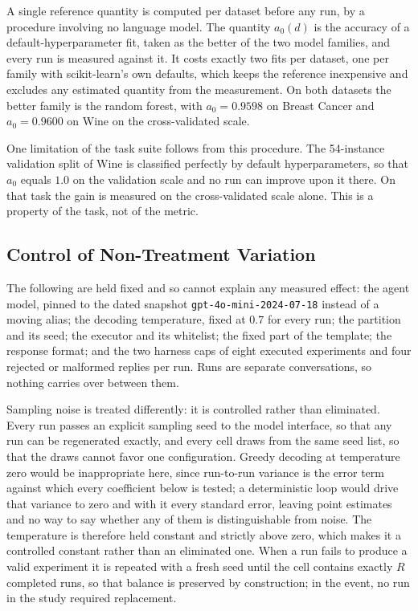 \documentclass[11pt]{article}
\begin{document}
A single reference quantity is computed per dataset before any run, by a procedure involving no language model. The quantity $a_0(d)$ is the accuracy of a default-hyperparameter fit, taken as the better of the two model families, and every run is measured against it. It costs exactly two fits per dataset, one per family with scikit-learn's own defaults, which keeps the reference inexpensive and excludes any estimated quantity from the measurement. On both datasets the better family is the random forest, with $a_0 = 0.9598$ on Breast Cancer and $a_0 = 0.9600$ on Wine on the cross-validated scale.

One limitation of the task suite follows from this procedure. The 54-instance validation split of Wine is classified perfectly by default hyperparameters, so that $a_0$ equals $1.0$ on the validation scale and no run can improve upon it there. On that task the gain is measured on the cross-validated scale alone. This is a property of the task, not of the metric.

\subsection{Control of Non-Treatment Variation}

The following are held fixed and so cannot explain any measured effect: the agent model, pinned to the dated snapshot \texttt{gpt-4o-mini-2024-07-18} instead of a moving alias; the decoding temperature, fixed at $0.7$ for every run; the partition and its seed; the executor and its whitelist; the fixed part of the template; the response format; and the two harness caps of eight executed experiments and four rejected or malformed replies per run. Runs are separate conversations, so nothing carries over between them.

Sampling noise is treated differently: it is controlled rather than eliminated. Every run passes an explicit sampling seed to the model interface, so that any run can be regenerated exactly, and every cell draws from the same seed list, so that the draws cannot favor one configuration. Greedy decoding at temperature zero would be inappropriate here, since run-to-run variance is the error term against which every coefficient below is tested; a deterministic loop would drive that variance to zero and with it every standard error, leaving point estimates and no way to say whether any of them is distinguishable from noise. The temperature is therefore held constant and strictly above zero, which makes it a controlled constant rather than an eliminated one. When a run fails to produce a valid experiment it is repeated with a fresh seed until the cell contains exactly $R$ completed runs, so that balance is preserved by construction; in the event, no run in the study required replacement.
\end{document}
